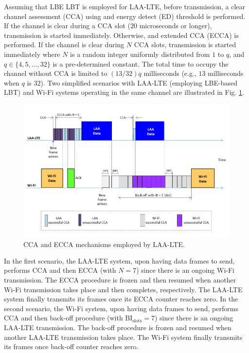 Assuming that LBE LBT is employed for \mbox{LAA-LTE}, before transmission, a clear channel assessment  (CCA) using and energy detect (ED) threshold is performed. If the channel is clear during a CCA slot ($20$ microseconds or longer), transmission is started immediately. Otherwise, and extended CCA (ECCA) is performed. If the channel is clear during $N$ CCA slots, transmission is started immediately where $N$ is a random integer uniformly distributed from $1$ to $q$, and $q \in \{4,5,...,32\}$ is a pre-determined constant. The total time to occupy the channel without CCA is limited to $(13/32)q$ milliseconds (e.g., $13$ milliseconds when $q$ is $32$). Two simplified scenarios with \mbox{LAA-LTE} (employing LBE-based LBT) and \mbox{Wi-Fi} systems operating in the same channel are illustrated in Fig. \ref{figs:LAA-LTE}. 
\begin{figure}[!ht]
	\centering
	\includegraphics[width=0.9\columnwidth]{figs/LAA-LTE}
	\caption{CCA and ECCA mechanisms employed by \mbox{LAA-LTE}.}
	\label{figs:LAA-LTE}
\end{figure}
In the first scenario, the \mbox{LAA-LTE} system, upon having data frames to send, performs CCA and then ECCA (with $N=7$) since there is an ongoing \mbox{Wi-Fi} transmission. The ECCA procedure is frozen and then resumed when another \mbox{Wi-Fi} transmission takes place and then completes, respectively. The \mbox{LAA-LTE} system finally transmits its frames once its ECCA counter reaches zero. In the second scenario, the \mbox{Wi-Fi} system, upon having data frames to send, performs CCA and then back-off procedure (with $\mathrm{BI_{slots}} = 7$) since there is an ongoing \mbox{LAA-LTE} transmission. The back-off procedure is frozen and resumed when another \mbox{LAA-LTE} transmission takes place. The \mbox{Wi-Fi} system finally transmits its frames once back-off counter reaches zero.

